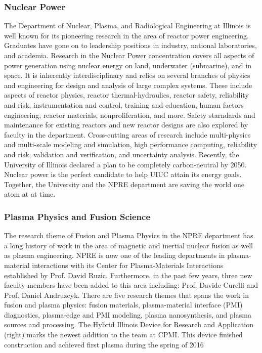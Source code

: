 \documentclass[11pt, letterpaper]{article}
\begin{document}
\subsubsection{Nuclear Power}
The Department of Nuclear, Plasma, and Radiological Engineering at Illinois is well known for its pioneering research in the area of reactor power engineering. Graduates have gone on to leadership positions in industry, national laboratories, and academia. Research in the Nuclear Power concentration covers all aspects of power generation using nuclear energy on land, underwater (submarine), and in space. It is inherently interdisciplinary and relies on several branches of physics and engineering for design and analysis of large complex systems. These include aspects of reactor physics, reactor thermal-hydraulics, reactor safety, reliability and risk, instrumentation and control, training and education, human factors engineering, reactor materials, nonproliferation, and more. Safety starndards and maintenance for existing reactors and new reactor designs are also explored by faculty in the department. Cross-cutting areas of research include multi-physics and multi-scale modeling and simulation, high performance computing, reliability and risk, validation and verification, and uncertainty analysis. Recently, the University of Illinois declared a plan to be completely carbon-neutral by 2050. Nuclear power is the perfect candidate to help UIUC attain its energy goals. Together, the University and the NPRE department are saving the world one atom at at time.

\subsubsection{Plasma Physics and Fusion Science}
The research theme of Fusion and Plasma Physics in the NPRE department has a long history of work in the area of magnetic and inertial nuclear fusion as well as plasma engineering. NPRE is now one of the leading departments in plasma-material interactions with its Center for Plasma-Materials Interactions established by Prof. David Ruzic. Furthermore, in the past few years, three new faculty members have been added to this area including: Prof. Davide Curelli and Prof. Daniel Andruzcyk. There are five research themes that spans the work in fusion and plasma physics: fusion materials, plasma-material interface (PMI) diagnostics, plasma-edge and PMI modeling, plasma nanosynthesis, and plasma sources and processing. The Hybrid Illinois Device for Research and Application (right) marks the newest addition to the team at CPMI. This device finished construction and achieved first plasma during the spring of 2016
\end{document}
